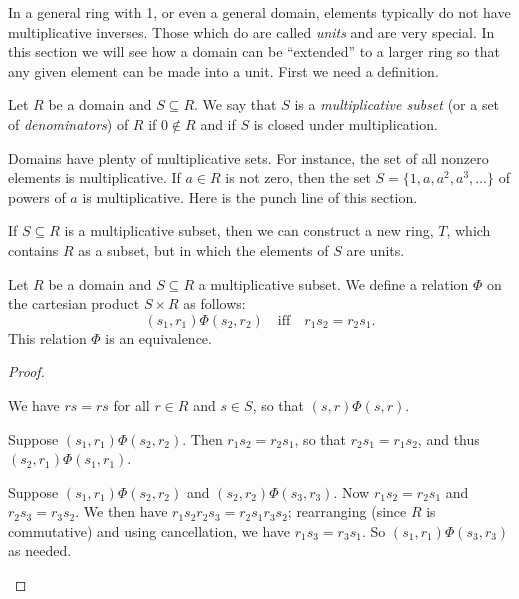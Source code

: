 In a general ring with 1, or even a general domain, elements typically do not have multiplicative inverses.
Those which do are called \emph{units} and are very special.
In this section we will see how a domain can be ``extended'' to a larger ring so that any given element can be made into a unit.
First we need a definition.

\begin{dfn} \label{dfn:multiplicative-subset}
Let \(R\) be a domain and \(S \subseteq R\).
We say that \(S\) is a \emph{multiplicative subset} (or a set of \emph{denominators}) of \(R\) if \(0 \notin R\) and if \(S\) is closed under multiplication.
\end{dfn}

Domains have plenty of multiplicative sets.
For instance, the set of all nonzero elements is multiplicative.
If \(a \in R\) is not zero, then the set \(S = \{ 1, a, a^2, a^3, \ldots \}\) of powers of \(a\) is multiplicative.
Here is the punch line of this section.

\begin{framed}
If \(S \subseteq R\) is a multiplicative subset, then we can construct a new ring, \(T\), which contains \(R\) as a subset, but in which the elements of \(S\) are units.
\end{framed}

\begin{prop}
Let \(R\) be a domain and \(S \subseteq R\) a multiplicative subset. We define a relation \(\Phi\) on the cartesian product \(S \times R\) as follows: \[ (s_1, r_1) \Phi (s_2, r_2) \quad \mathrm{iff} \quad r_1s_2 = r_2s_1. \]
This relation \(\Phi\) is an equivalence.
\end{prop}

\begin{proof}
\begin{inlineproplist}
\item We have \(rs = rs\) for all \(r \in R\) and \(s \in S\), so that \((s,r) \Phi (s,r)\).
\item Suppose \((s_1,r_1) \Phi (s_2,r_2)\).
Then \(r_1s_2 = r_2s_1\), so that \(r_2s_1 = r_1s_2\), and thus \((s_2,r_1) \Phi (s_1,r_1)\).
\item Suppose \((s_1, r_1) \Phi (s_2, r_2)\) and \((s_2, r_2) \Phi (s_3, r_3)\).
Now \(r_1s_2 = r_2s_1\) and \(r_2s_3 = r_3s_2\).
We then have \(r_1s_2r_2s_3 = r_2s_1r_3s_2\); rearranging (since \(R\) is commutative) and using cancellation, we have \(r_1s_3 = r_3s_1\).
So \((s_1, r_1) \Phi (s_3, r_3)\) as needed.
\end{inlineproplist}
\end{proof}

